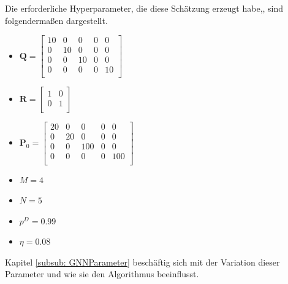 \documentclass[10pt,a4paper]{article}
\begin{document}
Die erforderliche Hyperparameter, die diese Schätzung erzeugt habe,, sind folgendermaßen dargestellt.\\
\begin{itemize}
  \item $\textbf{Q} = \begin{bmatrix}
10 &0 &0&0&0 \\
0 &10 &0&0&0\\
0 &0 &10&0&0\\
0 &0 &0&0&10\\
\end{bmatrix}$
  \item $\textbf{R} = \begin{bmatrix}
1 &0  \\
0 &1\\
\end{bmatrix}$
  \item $\textbf{P}_0 = \begin{bmatrix}
20 &0 &0&0&0 \\
0 &20 &0&0&0\\
0 &0 &100&0&0\\
0 &0 &0&0&100\\
\end{bmatrix}$
   \item $M = 4$
   \item $N = 5$
   \item $p^D = 0.99$
   \item $\eta = 0.08$
\end{itemize}
Kapitel \ref{subsub: GNNParameter} beschäftig sich mit der Variation dieser Parameter und wie sie den Algorithmus beeinflusst.\\
\end{document}
